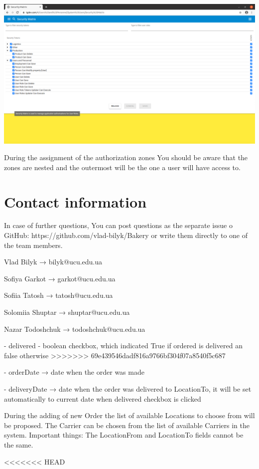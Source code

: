 \includegraphics[width=\textwidth]{sections/01-chapter/images/system155.png}

During the assignment of the authorization zones You should be aware that the zones are nested and the outermost will be the one a user will have access to. 

\section{Contact information}
In case of further questions, You can post questions as the separate issue o GitHub: https://github.com/vlad-bilyk/Bakery or write them directly to one of the team members. 

Vlad Bilyk  →  bilyk@ucu.edu.ua

Sofiya Garkot  →  garkot@ucu.edu.ua

Sofiia Tatosh  →  tatosh@ucu.edu.ua

Solomiia Shuptar  →  shuptar@ucu.edu.ua

Nazar Todoshchuk  →  todoshchuk@ucu.edu.ua

- delivered - boolean checkbox, which indicated True if ordered is delivered an false otherwise
>>>>>>> 69e439546dadf816a9766bf304f07a8540f5c687

- orderDate  →  date when the order was made

- deliveryDate  → date when the order was delivered to LocationTo, it will be set automatically to current date when delivered checkbox is clicked


During the adding of new Order the list of available Locations to choose from will be proposed. The Carrier can be chosen from the list of available Carriers in the system.
Important things: The LocationFrom and LocationTo fields cannot be the same.

<<<<<<< HEAD

